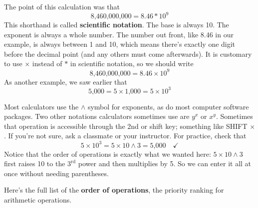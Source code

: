 The point of this calculation was that $$\text{8,460,000,000} = 8.46\ast10^9$$
This shorthand is called \textbf{scientific notation}.  The base is always 10.  The exponent is always a whole number.  The number out front, like 8.46 in our example, is always between 1 and 10, which means there's exactly one digit before the decimal point (and any others must come afterwards).  It is customary to use $\times$ instead of $\ast$ in scientific notation, so we should write
$$\text{8,460,000,000} = 8.46\times10^9$$
As another example, we saw earlier that $$\text{5,000} = 5 \times \text{1,000} = 5 \times 10^3$$

Most calculators use the $\wedge$ symbol for exponents, as do most computer software packages. Two other notations calculators sometimes use are $y^x$ or $x^y$.  Sometimes that operation is accessible through the 2nd or shift key; something like SHIFT $\times$.  If you're not sure, ask a classmate or your instructor.  For practice, check that
$$5 \times 10^3 = 5 \times 10 \wedge 3 = \text{5,000} \quad \checkmark$$
 Notice that the order of operations is exactly what we wanted here: $5 \times 10 \wedge 3$ first raises 10 to the $3^{\text{rd}}$ power and then multiplies by 5.  So we can enter it all at once without needing parentheses.
 
Here's the full list of the  \textbf{order of operations}, the priority ranking for arithmetic operations.

\bigskip
\bigskip

